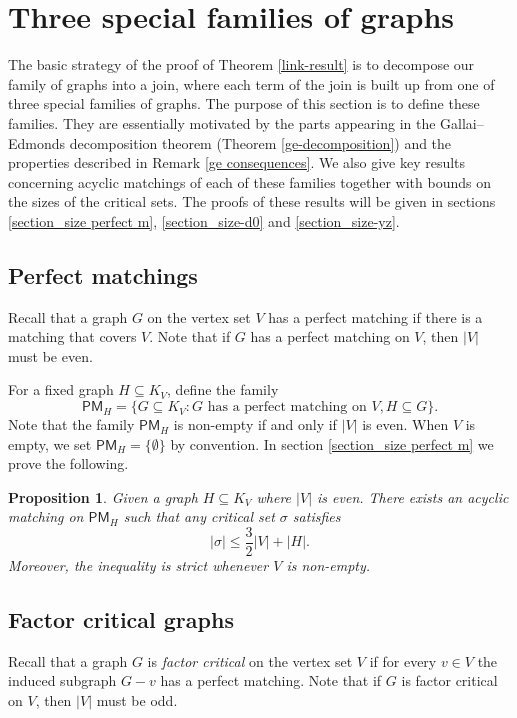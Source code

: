 \documentclass[10pt]{amsart}
\newtheorem{prop}[thm]{Proposition}
\theoremstyle{definition}
\begin{document}
	\section{Three special families of graphs} \label{three special}
	
	The basic strategy of the proof of Theorem \ref{link-result} is to decompose our family of graphs into a join, where each term of the join is built up from one of three special families of graphs. The purpose of this section is to define these families. They are essentially motivated by the parts appearing in the Gallai--Edmonds decomposition theorem (Theorem \ref{ge-decomposition}) and the properties described in Remark \ref{ge consequences}. We also give key results concerning acyclic matchings of each of these families together with bounds on the sizes of the critical sets. The proofs of these results will be given in sections \ref{section_size perfect m}, \ref{section_size-d0} and \ref{section_size-yz}.
	
	
	
	\subsection{Perfect matchings}
	Recall that a graph $G$ on the vertex set $V$ has a perfect matching if there is a matching that covers $V$. Note that if $G$ has a perfect matching on $V$, then $|V|$ must be even. 
	
	For a fixed graph $H\subseteq K_V$, define the family 
	\[\mathsf{PM}_H = \{G\subseteq K_V : G \text{ has a perfect matching on }V, H \subseteq G\}.\]
	Note that the family $\mathsf{PM}_H$ is non-empty if and only if $|V|$ is even. When $V$ is empty, we set $\mathsf{PM}_H=\{\emptyset \}$ by convention.
	In section \ref{section_size perfect m} we prove the following.
	
	\begin{prop}\label{size perfect m}
		Given a graph $H\subseteq K_V$ where $|V|$ is even. There exists an acyclic matching on $\mathsf{PM}_H$ such that any critical set $\sigma$ satisfies 
		\[|\sigma| \leq \textstyle{\frac{3}{2}}|V| +|H|.\]
		Moreover, the inequality is strict whenever $V$ is non-empty.
	\end{prop}
	
	\subsection{Factor critical graphs}
	Recall that a graph $G$ is {\em factor critical} on the vertex set $V$ if for every $v\in V$ the induced subgraph $G-v$ has a perfect matching. Note that if $G$ is factor critical on $V$, then $|V|$ must be odd.
	
\end{document}
